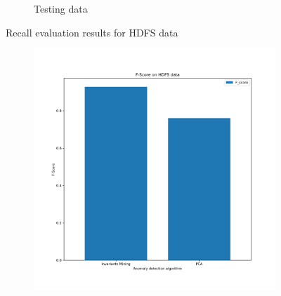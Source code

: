 \documentclass[12pt,a4paper]{article}
\begin{document}
\begin{figure}[H]
\begin{subfigure}[H]{0.45\textwidth}
			\vspace{-0.3cm}
			\caption{Testing data}
		\end{subfigure}
		\vspace{-0.1cm}
		\caption{Recall evaluation results for HDFS data}
	\end{figure}

	\vspace{-0.4cm}
	\begin{figure}[H]
		\centering
		\begin{subfigure}[H]{0.45\textwidth}
			\centering
			\includegraphics[width=1.3\textwidth]{Figures/F_2}
			

\end{subfigure}
\end{figure}
\end{document}
